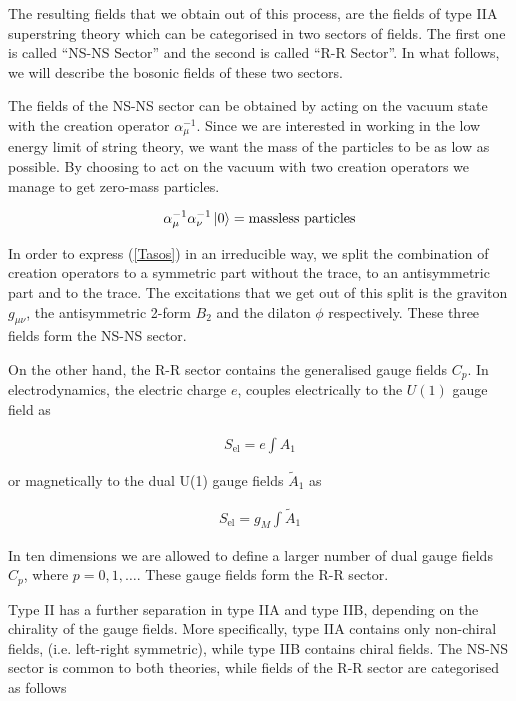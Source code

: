 \documentclass[a4paper,notitlepage]{report}
\begin{document}
\vspace{2em}

The resulting fields that we obtain out of this process, are the fields of type IIA superstring theory which can be categorised in two sectors of fields. The first one is called ``NS-NS Sector'' and the second is called ``R-R Sector''. In what follows, we will describe the bosonic fields of these two sectors.

The fields of the NS-NS sector can be obtained by acting on the vacuum state with the creation operator $\alpha^{-1}_\mu$. Since we are interested in working in the low energy limit of string theory, we want the mass of the particles to be as low as possible. By choosing to act on the vacuum with two creation operators we manage to get zero-mass particles.

\begin{align} \label{Tasos}
\alpha^{-1}_\mu \alpha^{-1}_\nu \ket{0} = \text{massless particles}
\end{align}

\vspace{0.5em}
In order to express (\ref{Tasos}) in an irreducible way, we split the combination of creation operators to a symmetric part without the trace, to an antisymmetric part and to the trace. The excitations that we get out of this split is the graviton $g_{\mu\nu}$, the antisymmetric 2-form $B_2$ and the dilaton $\phi$ respectively. These three fields form the NS-NS sector.

On the other hand, the R-R sector contains the generalised gauge fields $C_p$. In electrodynamics, the electric charge $e$, couples electrically to the $U(1)$ gauge field as

\begin{align}
S_{\text{el}} = e \int A_1
\end{align}

\vspace{0.5em}
or magnetically to the dual U(1) gauge fields ${\tilde{A}}_1$ as

\begin{align}
S_{\text{el}} = g_{M} \int {\tilde{A}}_1
\end{align}

\vspace{0.5em}
In ten dimensions we are allowed to define a larger number of dual gauge fields $C_p$, where $p=0,1, \ldots$. These gauge fields form the R-R sector.

Type II has a further separation in type IIA and type IIB, depending on the chirality of the gauge fields. More specifically, type IIA contains only non-chiral fields, (i.e. left-right symmetric), while type IIB contains chiral fields. The NS-NS sector is common to both theories, while fields of the R-R sector are categorised as follows 
\end{document}
